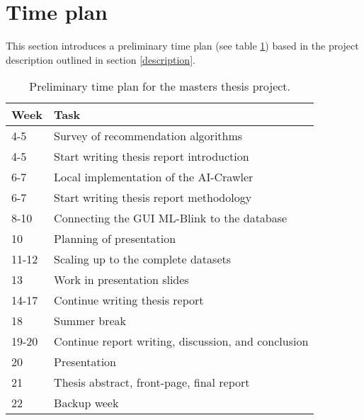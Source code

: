 \section{Time plan}

This section introduces a preliminary time plan (see table \ref{timeline:time_plan}) based in the project description outlined in section \ref{description}.

\begin{table}
  \centering
  \begin{tabularx}{\textwidth}{|l|X|}
    \hline
    Week & Task \\
    \hline
    4-5 & Survey of recommendation algorithms \\
    4-5 & Start writing thesis report introduction \\
    6-7 & Local implementation of the AI-Crawler \\
    6-7 & Start writing thesis report methodology \\
    8-10 & Connecting the GUI ML-Blink to the database \\
    10 & Planning of presentation \\
    11-12 & Scaling up to the complete datasets \\
    13 & Work in presentation slides \\
    14-17 & Continue writing thesis report \\
    18 & Summer break \\
    19-20 & Continue report writing, discussion, and conclusion \\
    20 & Presentation \\
    21 & Thesis abstract, front-page, final report \\
    22 & Backup week \\
    \hline
  \end{tabularx}
  \caption{Preliminary time plan for the masters thesis project.}
  \label{timeline:time_plan}
\end{table}